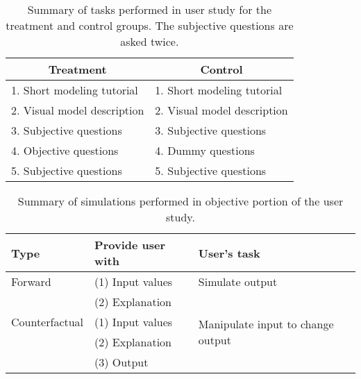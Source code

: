 \begin{table}[h]
\caption{Summary of tasks performed in user study for the treatment and control groups. The subjective questions are asked twice. }
\label{table:study}
\centering
\begin{tabular}{ll}
\toprule
\multicolumn{1}{c}{\textbf{Treatment}} & \multicolumn{1}{c}{\textbf{Control}} \\ 
\midrule
1. Short modeling tutorial        & 1. Short modeling tutorial         \\
2. Visual model description            & 2. Visual model description             \\
3. Subjective questions                & 3. Subjective questions                 \\
4. Objective questions                 & 4. Dummy questions                      \\
5. Subjective questions       & 5. Subjective questions   \\
\bottomrule      
\end{tabular}
\end{table}

\begin{table}[h]
\caption{Summary of simulations performed in objective portion of the user study.}
\label{table:simulations}
\centering
\begin{tabular}{lll}
\toprule
\textbf{Type} & \textbf{Provide user with} & \textbf{User's task} \\ 
\midrule
Forward & (1) Input values & Simulate output  \\
 & (2) Explanation & \\ 
\midrule
Counterfactual & (1) Input values & \multirow[t]{2}{3.4cm}{Manipulate input to change output} \\
 & (2) Explanation  &  \\
 & (3) Output  &  \\ 
\bottomrule
\end{tabular}
\end{table}







